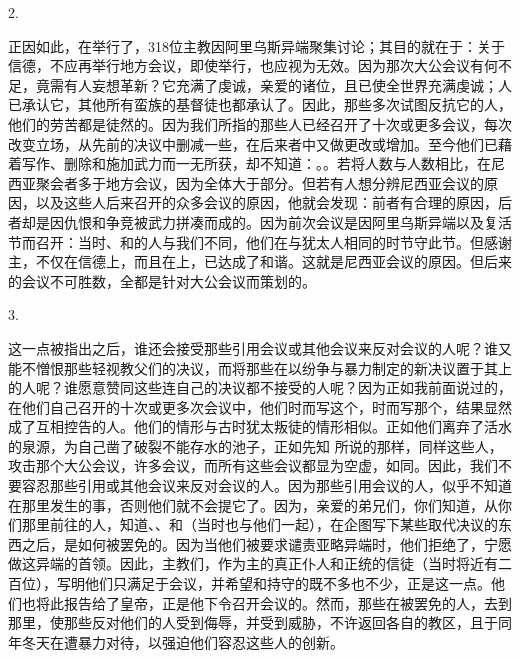 2. \par

正因如此，在举行了，318位主教因阿里乌斯异端聚集讨论；其目的就在于：关于信德，不应再举行地方会议，即使举行，也应视为无效。因为那次大公会议有何不足，竟需有人妄想革新？它充满了虔诚，亲爱的诸位，且已使全世界充满虔诚；人已承认它，其他所有蛮族的基督徒也都承认了。因此，那些多次试图反抗它的人，他们的劳苦都是徒然的。因为我们所指的那些人已经召开了十次或更多会议，每次改变立场，从先前的决议中删减一些，在后来者中又做更改或增加。至今他们已藉着写作、删除和施加武力而一无所获，却不知道：。。若将人数与人数相比，在尼西亚聚会者多于地方会议，因为全体大于部分。但若有人想分辨尼西亚会议的原因，以及这些人后来召开的众多会议的原因，他就会发现：前者有合理的原因，后者却是因仇恨和争竞被武力拼凑而成的。因为前次会议是因阿里乌斯异端以及复活节而召开：当时、和的人与我们不同，他们在与犹太人相同的时节守此节。但感谢主，不仅在信德上，而且在上，已达成了和谐。这就是尼西亚会议的原因。但后来的会议不可胜数，全都是针对大公会议而策划的。\par

3. \par

这一点被指出之后，谁还会接受那些引用会议或其他会议来反对会议的人呢？谁又能不憎恨那些轻视教父们的决议，而将那些在以纷争与暴力制定的新决议置于其上的人呢？谁愿意赞同这些连自己的决议都不接受的人呢？因为正如我前面说过的，在他们自己召开的十次或更多次会议中，他们时而写这个，时而写那个，结果显然成了互相控告的人。他们的情形与古时犹太叛徒的情形相似。正如他们离弃了活水的泉源，为自己凿了破裂不能存水的池子，正如先知  所说的那样，同样这些人，攻击那个大公会议，许多会议，而所有这些会议都显为空虚，如同。因此，我们不要容忍那些引用或其他会议来反对会议的人。因为那些引用会议的人，似乎不知道在那里发生的事，否则他们就不会提它了。因为，亲爱的弟兄们，你们知道，从你们那里前往的人，知道、、和（当时也与他们一起），在企图写下某些取代决议的东西之后，是如何被罢免的。因为当他们被要求谴责亚略异端时，他们拒绝了，宁愿做这异端的首领。因此，主教们，作为主的真正仆人和正统的信徒（当时将近有二百位），写明他们只满足于会议，并希望和持守的既不多也不少，正是这一点。他们也将此报告给了皇帝，正是他下令召开会议的。然而，那些在被罢免的人，去到那里，使那些反对他们的人受到侮辱，并受到威胁，不许返回各自的教区，且于同年冬天在遭暴力对待，以强迫他们容忍这些人的创新。\par

